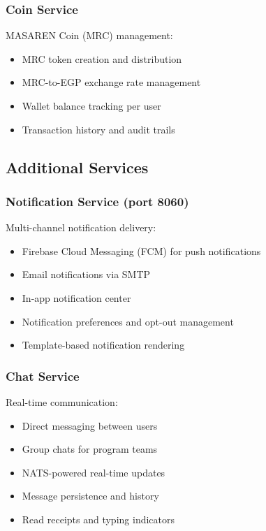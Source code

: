 \subsubsection{Coin Service}

MASAREN Coin (MRC) management:
\begin{itemize}
  \item MRC token creation and distribution
  \item MRC-to-EGP exchange rate management
  \item Wallet balance tracking per user
  \item Transaction history and audit trails
\end{itemize}

\subsection{Additional Services}

\subsubsection{Notification Service (port 8060)}

Multi-channel notification delivery:
\begin{itemize}
  \item Firebase Cloud Messaging (FCM) for push notifications
  \item Email notifications via SMTP
  \item In-app notification center
  \item Notification preferences and opt-out management
  \item Template-based notification rendering
\end{itemize}

\subsubsection{Chat Service}

Real-time communication:
\begin{itemize}
  \item Direct messaging between users
  \item Group chats for program teams
  \item NATS-powered real-time updates
  \item Message persistence and history
  \item Read receipts and typing indicators
\end{itemize}

